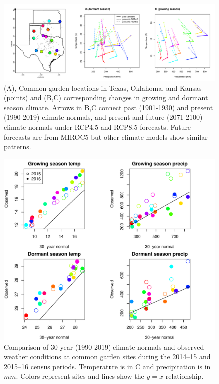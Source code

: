 \documentclass[12pt]{article}\usepackage[]{graphicx}\usepackage[dvipsnames]{xcolor}
\begin{document}
\begin{figure}[H]
	\centering
	\includegraphics[width=0.959\linewidth]{Figures/tom_map_v1.pdf}
	\caption{(A), Common garden locations in Texas, Oklahoma, and Kansas (points) and (B,C) corresponding changes in growing and dormant season climate. Arrows in B,C connect past (1901-1930) and present (1990-2019) climate normals, and present and future (2071-2100) climate normals under RCP4.5 and RCP8.5 forecasts. Future forecasts are from MIROC5 but other climate models show similar patterns.}
	\label{Sup:climate_variation1}
\end{figure}


\begin{figure}[H]
	\centering
	\includegraphics[width=0.959\linewidth]{Figures/clim_norm_vs_weather.pdf}
	\caption{Comparison of 30-year (1990-2019) climate normals and observed weather conditions at common garden sites during the 2014--15 and 2015--16 census periods. Temperature is in \degree C and precipitation is in $mm$. Colors represent sites and lines show the $y=x$ relationship.}
	\label{Sup:climate_normal_weather}
\end{figure}
\end{document}
